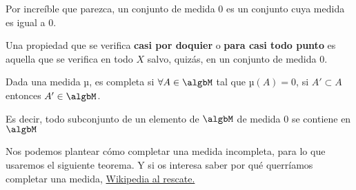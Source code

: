 \documentclass{apuntes}
\begin{document}
\begin{defn}
Por increíble que parezca, un conjunto de medida 0 es un conjunto cuya medida es igual a 0.
\end{defn}

\begin{defn}
Una propiedad que se verifica  \textbf{casi por doquier} o \textbf{para casi todo punto} es aquella que se verifica en todo $X$ salvo, quizás, en un conjunto de medida 0. \footnotemark
\end{defn}

\begin{defn}
Dada una medida µ, es completa si $\forall A \in \algbM$ tal que $µ(A)=0$, si $A'\subset A$ entonces $A' \in \algbM$.

Es decir, todo subconjunto de un elemento de $\algbM$ de medida 0 se contiene en $\algbM$
\end{defn}

Nos podemos plantear cómo completar una medida incompleta, para lo que usaremos el siguiente teorema. Y si os interesa saber por qué querríamos completar una medida, \href{http://en.wikipedia.org/wiki/Complete_measure#Motivation}{Wikipedia al rescate.}
\end{document}
